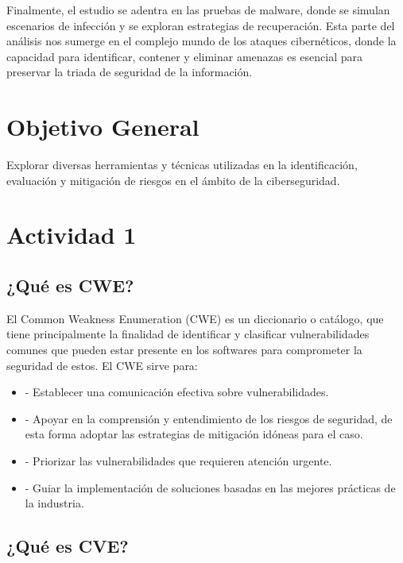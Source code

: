 \documentclass[stu, 11pt, letterpaper, donotrepeattitle, floatsintext, natbib]{apa7}
\begin{document}
Finalmente, el estudio se adentra en las pruebas de malware, donde se simulan escenarios de infección y se exploran estrategias de recuperación. Esta parte del análisis nos sumerge en el complejo mundo de los ataques cibernéticos, donde la capacidad para identificar, contener y eliminar amenazas es esencial para preservar la triada de seguridad de la información. 

\newpage

\section{\large Objetivo General}

Explorar diversas herramientas y técnicas utilizadas en la identificación, evaluación y mitigación de riesgos en el ámbito de la ciberseguridad. 

\newpage

\section{\large Actividad 1}

\subsection{¿Qué es CWE?} 

El Common Weakness Enumeration (CWE) es un diccionario o catálogo, que tiene principalmente la finalidad de identificar y clasificar vulnerabilidades comunes que pueden estar presente en los softwares para comprometer la seguridad de estos. El CWE sirve para:

\begin{itemize}
\item[] - Establecer una comunicación efectiva sobre vulnerabilidades.
\item[] - Apoyar en la comprensión y entendimiento de los riesgos de seguridad, de esta forma adoptar las estrategias de mitigación idóneas para el caso.
\item[] - Priorizar las vulnerabilidades que requieren atención urgente.
\item[] - Guiar la implementación de soluciones basadas en las mejores prácticas de la industria.
\end{itemize}

\subsection{¿Qué es CVE?} 
\end{document}
